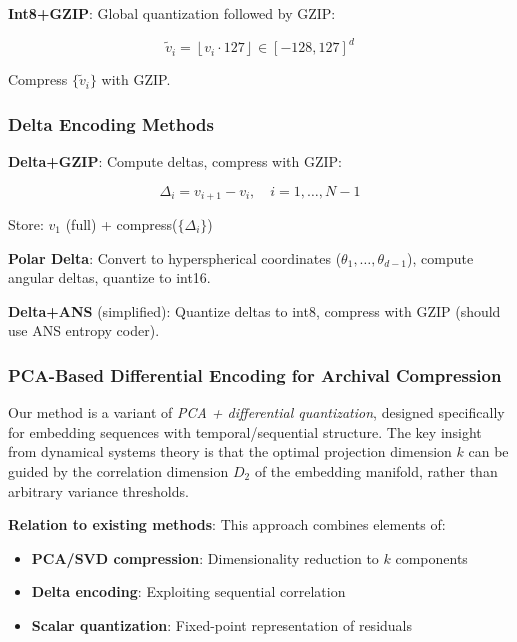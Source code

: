 \documentclass[11pt,a4paper]{article}
\begin{document}
\textbf{Int8+GZIP}: Global quantization followed by GZIP:

\begin{equation}
\tilde{v}_i = \left\lfloor v_i \cdot 127 \right\rfloor \in [-128, 127]^d
\end{equation}

Compress $\{\tilde{v}_i\}$ with GZIP.

\subsubsection{Delta Encoding Methods}

\textbf{Delta+GZIP}: Compute deltas, compress with GZIP:

\begin{equation}
\Delta_i = v_{i+1} - v_i, \quad i = 1, \ldots, N-1
\end{equation}

Store: $v_1$ (full) + compress($\{\Delta_i\}$)

\textbf{Polar Delta}: Convert to hyperspherical coordinates ($\theta_1, \ldots, \theta_{d-1}$), compute angular deltas, quantize to int16.

\textbf{Delta+ANS} (simplified): Quantize deltas to int8, compress with GZIP (should use ANS entropy coder).

\subsubsection{PCA-Based Differential Encoding for Archival Compression}

Our method is a variant of \textit{PCA + differential quantization}, designed specifically for embedding sequences with temporal/sequential structure. The key insight from dynamical systems theory is that the optimal projection dimension $k$ can be guided by the correlation dimension $D_2$ of the embedding manifold, rather than arbitrary variance thresholds.

\textbf{Relation to existing methods}: This approach combines elements of:
\begin{itemize}
\item \textbf{PCA/SVD compression}: Dimensionality reduction to $k$ components
\item \textbf{Delta encoding}: Exploiting sequential correlation
\item \textbf{Scalar quantization}: Fixed-point representation of residuals
\end{itemize}
\end{document}
